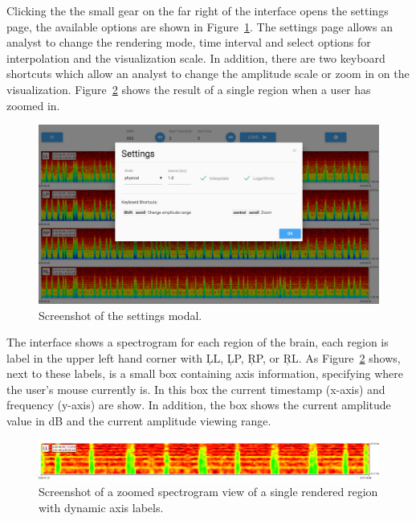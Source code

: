 Clicking the the small gear on the far right of the interface opens the
settings page, the available options are shown in Figure~\ref{fig:settings}.
The settings page allows an analyst to change the rendering mode, time interval
and select options for interpolation and the visualization scale. In addition,
there are two keyboard shortcuts which allow an analyst to change the amplitude
scale or zoom in on the visualization. Figure~\ref{fig:zoomed-region} shows the
result of a single region when a user has zoomed in. \\

\begin{figure}[h]
\begin{center}
\includegraphics[scale=0.35]{./img/settings.png}
\caption{Screenshot of the settings modal.}
\label{fig:settings}
\end{center}
\end{figure}

The interface shows a spectrogram for each region of the brain, each region is
label in the upper left hand corner with \c{LL}, \c{LP}, \c{RP}, or \c{RL}.  As
Figure~\ref{fig:zoomed-region} shows, next to these labels, is a small box
containing axis information, specifying where the user's mouse currently is. In
this box the current timestamp (x-axis) and frequency (y-axis) are show. In
addition, the box shows the current amplitude value in dB and the current
amplitude viewing range. \\

\begin{figure}[h]
\begin{center}
\includegraphics[scale=0.35]{./img/zoomed-region.png}
\caption{Screenshot of a zoomed spectrogram view of a single rendered region
  with dynamic axis labels.}
\label{fig:zoomed-region}
\end{center}
\end{figure}

